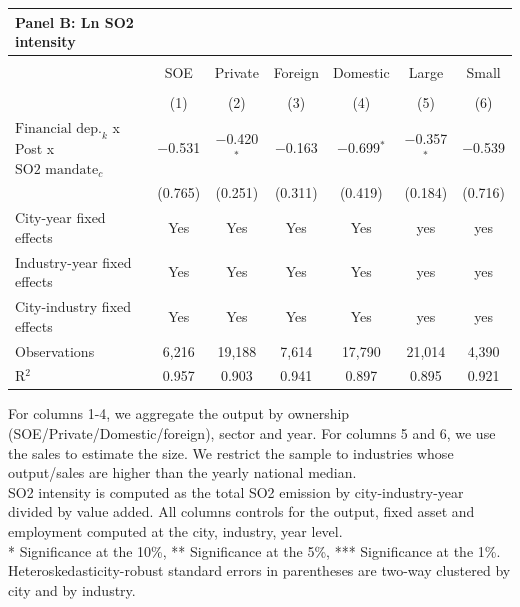 \documentclass[12pt]{article}
\begin{document}
\begin{table}[htbp]
{\begin{threeparttable}
\begin{tabular}{l*{6}{c}}
    \multicolumn{1}{l}{\textbf{Panel B: Ln SO2 intensity}} \\
    \toprule
    
    & \multicolumn{6}{c}{} \\ 
    \hline
    & \multicolumn{1}{c}{SOE} & \multicolumn{1}{c}{Private}
    & \multicolumn{1}{c}{Foreign} & \multicolumn{1}{c}{Domestic}
    & \multicolumn{1}{c}{Large}& \multicolumn{1}{c}{Small}
    \\ 
    \\[-1.8ex] & (1) & (2) & (3) & (4) & (5) & (6)  \\ 
    \hline 
      
    $\text{Financial dep.}_k$ x Post x $\text{SO2 mandate}_c$ & $-$0.531& $-$0.420$^{*}$ & $-$0.163 & $-$0.699$^{*}$ & $-$0.357$^{*}$ & $-$0.539 \\ 
  & (0.765) & (0.251) & (0.311) & (0.419) & (0.184) & (0.716) \\
    \midrule 
    
    City-year fixed effects & Yes & Yes & Yes & Yes & yes & yes \\ 
    Industry-year fixed effects & Yes & Yes & Yes & Yes & yes & yes \\ 
    City-industry fixed effects & Yes & Yes & Yes & Yes & yes & yes \\ 
    Observations & 6,216 & 19,188 & 7,614 & 17,790 & 21,014 & 4,390 \\ 
    R$^{2}$ & 0.957 &0.903  & 0.941 & 0.897 & 0.895 & 0.921 \\ 
    
    \bottomrule
  \end{tabular}
  \begin{tablenotes}
      \small
      \item For columns 1-4, we aggregate the output by ownership (SOE/Private/Domestic/foreign), sector and year. For columns 5 and 6, we use the sales to estimate the size. We restrict the sample to industries whose output/sales are higher than the yearly national median. \\
      SO2 intensity is computed as the total SO2 emission by city-industry-year divided by value added. All columns controls for the output, fixed asset and employment computed at the city, industry, year level. \\
      * Significance at the 10\%, ** Significance at the 5\%, *** Significance at the 1\%. Heteroskedasticity-robust standard errors in parentheses are two-way clustered by city and by industry.
    \end{tablenotes}
\end{threeparttable}}
\end{table}
\end{document}
